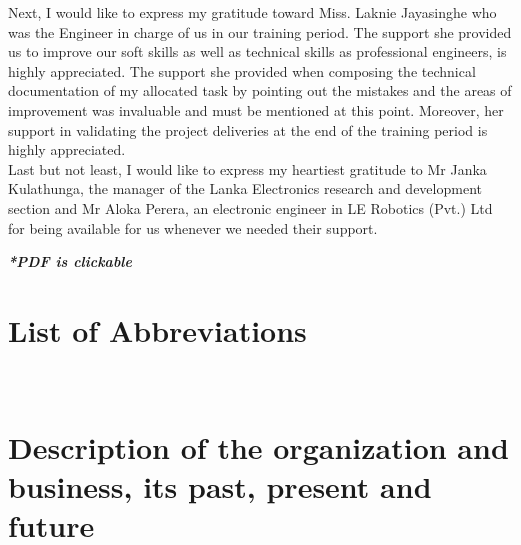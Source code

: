 \documentclass[a4paper,12pt]{report}
\begin{document}
Next, I would like to express my gratitude toward Miss. Laknie Jayasinghe who was the Engineer in charge of us in our training period. The support she provided us to improve our soft skills as well as technical skills as professional engineers, is highly appreciated. The support she provided when composing the technical documentation of my allocated task by pointing out the mistakes and the areas of improvement was invaluable and must be mentioned at this point. Moreover, her support in validating the project deliveries at the end of the training period is highly appreciated.\\

Last but not least, I would like to express my heartiest gratitude to Mr Janka Kulathunga, the manager of the Lanka Electronics research and development section and Mr Aloka Perera, an electronic engineer in LE Robotics (Pvt.) Ltd for being available for us whenever we needed their support.






\tableofcontents %
\vfill
\begin{center}
	\textbf{\textit{*PDF is clickable}}
\end{center}

\chapter*{List of Abbreviations}


\listoffigures %
\listoftables %




\pagebreak
\newpage \ \newpage
\setcounter{page}{1}

\chapter{Description of the organization and business, its past, present and	future}
\end{document}
